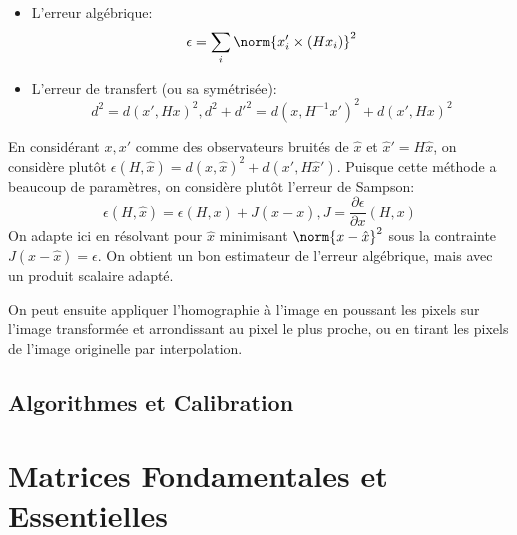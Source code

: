 \documentclass[info, math]{mpb-cours}
\begin{document}
\begin{itemize}
  \item L'erreur algébrique:
  \begin{equation*}
    \epsilon = \sum_{i} \norm{x_{i}' \times (Hx_{i})}^{2}
  \end{equation*}
\item L'erreur de transfert (ou sa symétrisée):
  \begin{equation*}
    d^{2} = d(x', Hx)^{2}, d^{2} + d'^{2} = d(x, H^{-1}x')^{2} + d(x', Hx)^{2}
  \end{equation*}
\end{itemize}

En considérant $x, x'$ comme des observateurs bruités de $\hat{x}$ et $\hat{x}' = H\hat{x}$, on considère plutôt $\epsilon(H, \hat{x}) = d(x, \hat{x})^{2} + d(x', H\hat{x}')$.
Puisque cette méthode a beaucoup de paramètres, on considère plutôt l'erreur de Sampson:
\begin{equation*}
  \epsilon(H, \hat{x}) = \epsilon(H, x) + J(\hat{x} - x), J = \frac{\partial \epsilon}{\partial x}(H, x)
\end{equation*}
On adapte ici en résolvant pour $\hat{x}$ minimisant $\norm{x - \hat{x}}^{2}$ sous la contrainte $J(x - \hat{x}) = \epsilon$.
On obtient un bon estimateur de l'erreur algébrique, mais avec un produit scalaire adapté.

On peut ensuite appliquer l'homographie à l'image en poussant les pixels sur l'image transformée et arrondissant au pixel le plus proche, ou en tirant les pixels de l'image originelle par interpolation.

\subsection{Algorithmes et Calibration}

\section{Matrices Fondamentales et Essentielles}
\end{document}
